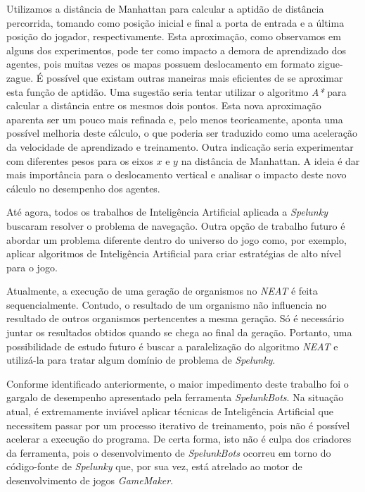 Utilizamos a distância de Manhattan para calcular a aptidão de distância
percorrida, tomando como posição inicial e final a porta de entrada e a última
posição do jogador, respectivamente. Esta aproximação, como observamos em alguns
dos experimentos, pode ter como impacto a demora de aprendizado dos agentes,
pois muitas vezes os mapas possuem deslocamento em formato zigue-zague. É
possível que existam outras maneiras mais eficientes de se aproximar esta função
de aptidão. Uma sugestão seria tentar utilizar o algoritmo \textit{A*} para
calcular a distância entre os mesmos dois pontos. Esta nova aproximação aparenta
ser um pouco mais refinada e, pelo menos teoricamente, aponta uma possível
melhoria deste cálculo, o que poderia ser traduzido como uma aceleração da
velocidade de aprendizado e treinamento. Outra indicação seria experimentar com
diferentes pesos para os eixos $x$ e $y$ na distância de Manhattan.  A ideia é
dar mais importância para o deslocamento vertical e analisar o impacto deste
novo cálculo no desempenho dos agentes.

Até agora, todos os trabalhos de Inteligência Artificial aplicada a
\textit{Spelunky} buscaram resolver o problema de navegação. Outra opção de
trabalho futuro é abordar um problema diferente dentro do universo do jogo como,
por exemplo, aplicar algoritmos de Inteligência Artificial para criar
estratégias de alto nível para o jogo.

Atualmente, a execução de uma geração de organismos no \textit{NEAT} é feita
sequencialmente.  Contudo, o resultado de um organismo não influencia no
resultado de outros organismos pertencentes a mesma geração. Só é necessário
juntar os resultados obtidos quando se chega ao final da geração. Portanto, uma
possibilidade de estudo futuro é buscar a paralelização do algoritmo
\textit{NEAT} e utilizá-la para tratar algum domínio de problema de
\textit{Spelunky}.

Conforme identificado anteriormente, o maior impedimento deste trabalho foi o
gargalo de desempenho apresentado pela ferramenta \textit{SpelunkBots}. Na
situação atual, é extremamente inviável aplicar técnicas de Inteligência
Artificial que necessitem passar por um processo iterativo de treinamento, pois
não é possível acelerar a execução do programa. De certa forma, isto não é culpa
dos criadores da ferramenta, pois o desenvolvimento de \textit{SpelunkBots}
ocorreu em torno do código-fonte de \textit{Spelunky} que, por sua vez, está
atrelado ao motor de desenvolvimento de jogos \textit{GameMaker}. 

